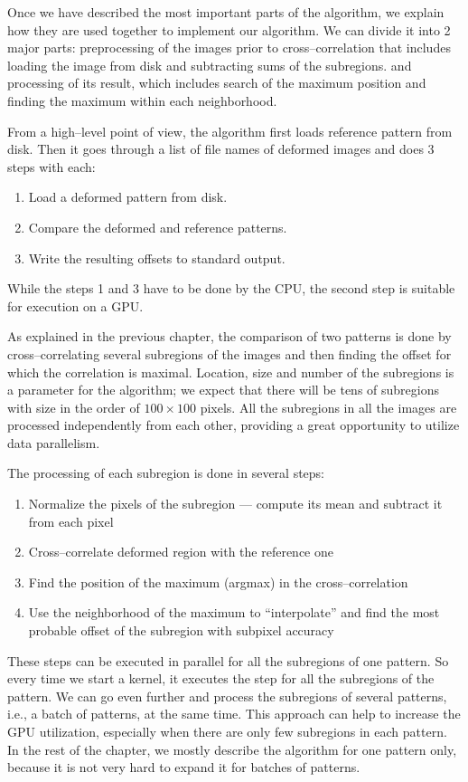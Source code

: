 Once we have described the most important parts of the algorithm, we explain how they are used together to implement our algorithm. We can divide it into 2 major parts: preprocessing of the images prior to cross--correlation that includes loading the image from disk and subtracting sums of the subregions.  and processing of its result, which includes search of the maximum position and finding the maximum within each neighborhood.

From a high--level point of view, the algorithm first loads reference pattern from disk. Then it goes through a list of file names of deformed images and does 3 steps with each:
\begin{enumerate}
	\item Load a deformed pattern from disk.
	\item Compare the deformed and reference patterns.
	\item Write the resulting offsets to standard output.
\end{enumerate}
While the steps 1 and 3 have to be done by the CPU, the second step is suitable for execution on a GPU.

As explained in the previous chapter, the comparison of two patterns is done by cross--correlating several subregions of the images and then finding the offset for which the correlation is maximal. Location, size and number of the subregions is a parameter for the algorithm; we expect that there will be tens of subregions with size in the order of $100 \times 100$ pixels. All the subregions in all the images are processed independently from each other, providing a great opportunity to utilize data parallelism.



The processing of each subregion is done in several steps:
\begin{enumerate}
	\item Normalize the pixels of the subregion --- compute its mean and subtract it from each pixel
	\item Cross--correlate deformed region with the reference one
	\item Find the position of the maximum (argmax) in the cross--correlation
	\item Use the neighborhood of the maximum to ``interpolate'' and find the most probable offset of the subregion with subpixel accuracy
\end{enumerate}

These steps can be executed in parallel for all the subregions of one pattern. So every time we start a kernel, it executes the step for all the subregions of the pattern. We can go even further and process the subregions of several patterns, i.e., a batch of patterns, at the same time. This approach can help to increase the GPU utilization, especially when there are only few subregions in each pattern. In the rest of the chapter, we mostly describe the algorithm for one pattern only, because it is not very hard to expand it for batches of patterns.

